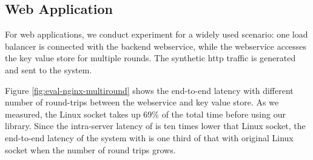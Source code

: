 \subsection{Web Application}
For web applications, we conduct experiment for a widely used scenario: one load balancer is connected with the backend webservice, while the webservice accesses the key value store for multiple rounds. The synthetic http traffic is generated and sent to the system.

Figure \ref{fig:eval-nginx-multiround} shows the end-to-end latency with different number of round-trips between the webservice and key value store. As we measured, the Linux socket takes up 69\% of the total time before using our library. Since the intra-server latency of \sys{} is ten times lower that Linux socket, the end-to-end latency of the system with \sys{}  is one third of that with original Linux socket when the number of round trips grows.













